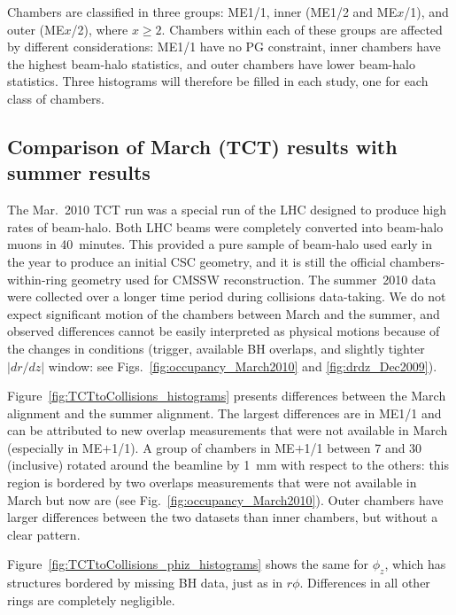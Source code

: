 \documentclass[12pt]{article}
\begin{document}
Chambers are classified in three groups: ME1/1, inner (ME1/2 and
ME$x$/1), and outer (ME$x$/2), where $x \ge 2$.  Chambers within each
of these groups are affected by different considerations: ME1/1 have
no PG constraint, inner chambers have the highest beam-halo
statistics, and outer chambers have lower beam-halo statistics.  Three
histograms will therefore be filled in each study, one for each class
of chambers.

\subsection{Comparison of March (TCT) results with summer results}

The Mar.~2010 TCT run was a special run of the LHC designed to produce
high rates of beam-halo.  Both LHC beams were completely converted
into beam-halo muons in 40~minutes.  This provided a pure sample of
beam-halo used early in the year to produce an initial CSC geometry,
and it is still the official chambers-within-ring geometry used for
CMSSW reconstruction.  The summer~2010 data were collected over a
longer time period during collisions data-taking.  We do not expect
significant motion of the chambers between March and the summer, and
observed differences cannot be easily interpreted as physical motions
because of the changes in conditions (trigger, available BH overlaps,
and slightly tighter $|dr/dz|$ window: see
Figs.~\ref{fig:occupancy_March2010} and \ref{fig:drdz_Dec2009}).

Figure~\ref{fig:TCTtoCollisions_histograms} presents differences
between the March alignment and the summer alignment.  The largest
differences are in ME1/1 and can be attributed to new overlap
measurements that were not available in March (especially in
ME$+$1/1).  A group of chambers in ME$+$1/1 between 7 and 30 (inclusive)
rotated around the beamline by 1~mm with respect to the others: this
region is bordered by two overlaps measurements that were not
available in March but now are (see
Fig.~\ref{fig:occupancy_March2010}).  Outer chambers have larger
differences between the two datasets than inner chambers, but without
a clear pattern.

Figure~\ref{fig:TCTtoCollisions_phiz_histograms} shows the same for
$\phi_z$, which has structures bordered by missing BH data, just as in
$r\phi$.  Differences in all other rings are completely negligible.
\end{document}
